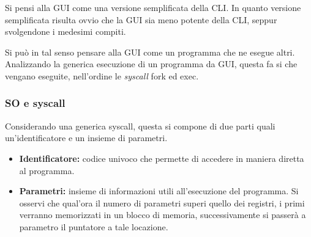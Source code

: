 Si pensi alla GUI come una versione semplificata della CLI\footnotemark.
In quanto versione semplificata risulta ovvio che la GUI sia meno potente della CLI, seppur svolgendone i medesimi compiti.

\noindent Si può in tal senso pensare alla GUI come un programma che ne esegue altri.
Analizzando la generica esecuzione di un programma da GUI, questa fa si che vengano eseguite, nell'ordine le \emph{syscall} fork ed exec.

\subsubsection{SO e syscall}
Considerando una generica syscall, questa si compone di due parti quali un'identificatore e un insieme di parametri.
\begin{itemize}
    \item \textbf{Identificatore:} codice univoco che permette di accedere in maniera diretta al programma.
    \item \textbf{Parametri:} insieme di informazioni utili all'esecuzione del programma.
          Si osservi che qual'ora il numero di parametri superi quello dei registri, i primi verranno memorizzati in un blocco di memoria,
          successivamente si passerà a parametro il puntatore a tale locazione.
\end{itemize}